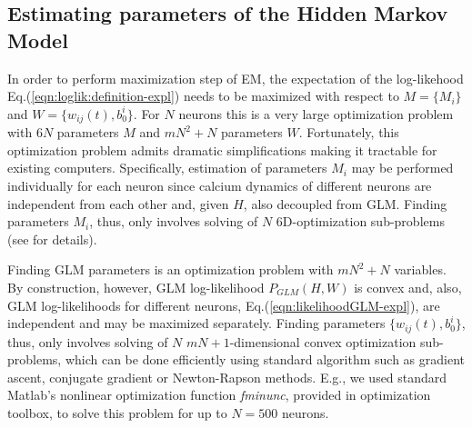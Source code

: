 \documentclass[amsmath,amssymb]{revtex4}
\begin{document}
\subsection{\label{sec:methods:parameters HMM}Estimating parameters of the Hidden Markov Model}
In order to perform maximization step of EM, the expectation of the log-likehood  Eq.(\ref{eqn:loglik:definition-expl}) needs to be maximized with respect to $M=\{M_i\}$ and $W=\{w_{ij}(t),b_0^i\}$. For $N$ neurons this is a very large optimization problem with $6N$ parameters $M$ and $m N^2 + N$ parameters $W$.
Fortunately, this optimization problem admits dramatic simplifications making it tractable for existing computers.
Specifically, estimation of parameters $M_i$ may be performed individually for each neuron since calcium dynamics of different neurons are independent from each other and, given $H$, also decoupled from GLM. Finding parameters $M_i$, thus, only involves solving of $N$ 6D-optimization sub-problems (see \cite{Vogelstein2009} for details).

Finding GLM parameters is an optimization problem with $mN^2+N$ variables. By construction, however, GLM log-likelihood $P_{GLM}(H,W)$ is convex and, also, GLM log-likelihoods for different neurons, Eq.(\ref{eqn:likelihoodGLM-expl}), are independent and may be maximized separately. Finding parameters $\{w_{ij}(t),b^i_0\}$, thus, only involves solving of $N$ $mN+1$-dimensional convex optimization sub-problems, which can be done efficiently using standard algorithm such as gradient ascent, conjugate gradient or Newton-Rapson methods. E.g., we used standard Matlab's nonlinear optimization function {\em fminunc}, provided in optimization toolbox, to solve this problem for up to $N=500$ neurons.
\end{document}
